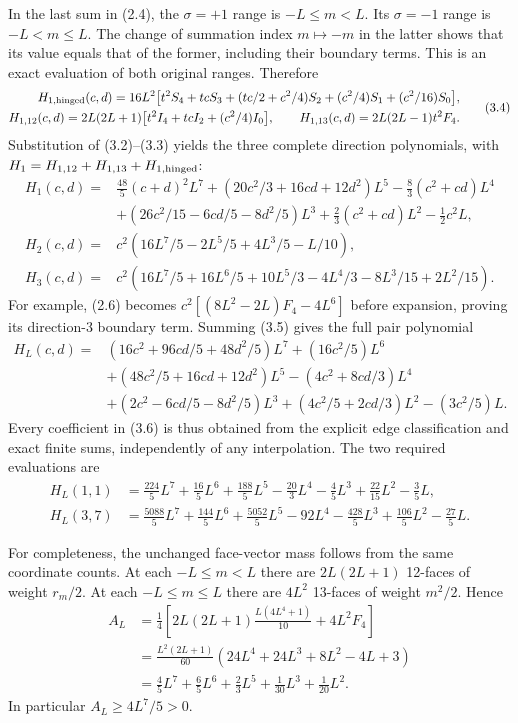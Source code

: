 \documentclass[
  11pt,
]{article}
\begin{document}
In the last sum in (2.4), the \(\sigma=+1\) range is \(-L\le m<L\). Its
\(\sigma=-1\) range is \(-L<m\le L\). The change of summation index
\(m\mapsto-m\) in the latter shows that its value equals that of the
former, including their boundary terms. This is an exact evaluation of
both original ranges. Therefore \[
\begin{split}
 H_{1,\rm hinged}(c,d)
 =16L^2\bigl[t^2S_4+tcS_3
       +(tc/2+c^2/4)S_2+(c^2/4)S_1+(c^2/16)S_0\bigr],\\
 H_{1,12}(c,d)=2L(2L+1)
         \bigl[t^2I_4+tcI_2+(c^2/4)I_0\bigr],\qquad
 H_{1,13}(c,d)=2L(2L-1)t^2F_4.
\end{split}
\tag{3.4}
\] Substitution of (3.2)--(3.3) yields the three complete direction
polynomials, with \(H_1=H_{1,12}+H_{1,13}+H_{1,\rm hinged}\): \[
\begin{split}
 H_1(c,d)={}&\frac{48}{5}(c+d)^2L^7
 +(20c^2/3+16cd+12d^2)L^5
 -\frac83(c^2+cd)L^4\\
 &+(26c^2/15-6cd/5-8d^2/5)L^3
 +\frac23(c^2+cd)L^2-\frac12c^2L,\\
 H_2(c,d)={}&c^2(16L^7/5-2L^5/5+4L^3/5-L/10),\\
 H_3(c,d)={}&c^2(16L^7/5+16L^6/5+10L^5/3
                       -4L^4/3-8L^3/15+2L^2/15).
\end{split}
\tag{3.5}
\] For example, (2.6) becomes \(c^2[(8L^2-2L)F_4-4L^6]\) before
expansion, proving its direction-3 boundary term. Summing (3.5) gives
the full pair polynomial \[
\boxed{\begin{split}
 H_L(c,d)={}&(16c^2+96cd/5+48d^2/5)L^7+(16c^2/5)L^6\\
 &+(48c^2/5+16cd+12d^2)L^5-(4c^2+8cd/3)L^4\\
 &+(2c^2-6cd/5-8d^2/5)L^3
 +(4c^2/5+2cd/3)L^2-(3c^2/5)L.
\end{split}}
\tag{3.6}
\] Every coefficient in (3.6) is thus obtained from the explicit edge
classification and exact finite sums, independently of any
interpolation. The two required evaluations are \[
\boxed{\begin{split}
 H_L(1,1)&=\frac{224}{5}L^7+\frac{16}{5}L^6
 +\frac{188}{5}L^5-\frac{20}{3}L^4-\frac45L^3
 +\frac{22}{15}L^2-\frac35L,\\
 H_L(3,7)&=\frac{5088}{5}L^7+\frac{144}{5}L^6
 +\frac{5052}{5}L^5-92L^4-\frac{428}{5}L^3
 +\frac{106}{5}L^2-\frac{27}{5}L.
\end{split}}
\tag{3.7}
\]

For completeness, the unchanged face-vector mass follows from the same
coordinate counts. At each \(-L\le m<L\) there are \(2L(2L+1)\) 12-faces
of weight \(r_m/2\). At each \(-L\le m\le L\) there are \(4L^2\)
13-faces of weight \(m^2/2\). Hence \[
\begin{split}
 A_L&=\frac14\left[
 2L(2L+1)\frac{L(4L^4+1)}{10}+4L^2F_4\right]\\
 &=\frac{L^2(2L+1)}{60}(24L^4+24L^3+8L^2-4L+3)\\
 &=\frac45L^7+\frac65L^6+\frac23L^5+\frac1{30}L^3+\frac1{20}L^2.
\end{split}
\tag{3.8}
\] In particular \(A_L\ge4L^7/5>0\).
\end{document}
